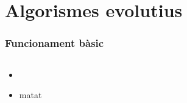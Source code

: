 \documentclass{beamer}
\begin{document}
\begin{frame}
\end{frame}

\section{Algorismes evolutius} %
\label{sec:Algorismes evolutius}

\begin{frame}
	\frametitle{Funcionament bàsic}
	\begin{columns}[c]
		\begin{itemize}
			\item 
				\pause
			\item matat
		\end{itemize}
	\end{columns}
\end{frame}
\end{document}
